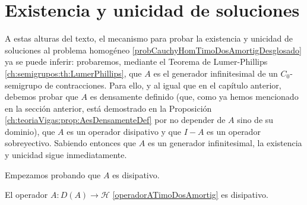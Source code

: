 \section{Existencia y unicidad de soluciones}
\label{ch:TimoshenkoFric:section:existUnicidad}

A estas alturas del texto, el mecanismo para probar la existencia y unicidad de soluciones al problema homogéneo \eqref{probCauchyHomTimoDosAmortigDesglosado} ya se puede inferir: probaremos, mediante el Teorema de Lumer-Phillips \ref{ch:semigrupos:th:LumerPhillips}, que $A$ es el generador infinitesimal de un $C_0$-semigrupo de contracciones. Para ello, y al igual que en el capítulo anterior, debemos probar que $A$ es densamente definido (que, como ya hemos mencionado en la sección anterior, está demostrado en la Proposición \ref{ch:teoriaVigas:prop:AesDensamenteDef} por no depender de $A$ sino de su dominio), que $A$ es un operador disipativo y que $I-A$ es un operador sobreyectivo. Sabiendo entonces que $A$ es un generador infinitesimal, la existencia y unicidad sigue inmediatamente.

Empezamos probando que $A$ es disipativo.

\begin{Proposicion}
    \label{ch:TimoshenkoFric:prop:AesDisipativo}

    El operador $A : D(A) \rightarrow \mathcal{H}$ \eqref{operadorATimoDosAmortig} es disipativo.
\end{Proposicion}

